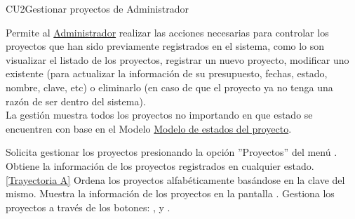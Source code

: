 	\begin{UseCase}{CU2}{Gestionar proyectos de Administrador}{
			
			Permite al \hyperlink{admin}{Administrador} realizar las acciones necesarias para controlar los proyectos que han sido previamente registrados en el sistema, como lo son visualizar el listado de los proyectos, registrar un nuevo proyecto, modificar uno existente (para actualizar la información de su presupuesto, fechas, estado, nombre, clave, etc) o eliminarlo (en caso de que el proyecto ya no tenga una razón de ser dentro del sistema).\\
			La gestión muestra todos los proyectos no importando en que estado se encuentren con base en el Modelo \hyperlink{edoProy}{Modelo de estados del proyecto}.
	}
		
	
		
	\end{UseCase}
	\begin{UCtrayectoria}
		\UCpaso[\UCactor] Solicita gestionar los proyectos presionando la opción ''Proyectos'' del menú .
		\UCpaso[\UCsist] Obtiene la información de los proyectos registrados en cualquier estado. \hyperlink{CU2:TAA}{[Trayectoria A]}
		\UCpaso[\UCsist] Ordena los proyectos alfabéticamente basándose en la clave del mismo.
		\UCpaso[\UCsist] Muestra la información de los proyectos en la pantalla . \label{GP-P3}
		\UCpaso[\UCactor] Gestiona los proyectos a través de los botones: , \editar  y \eliminar. 
	\end{UCtrayectoria}		
